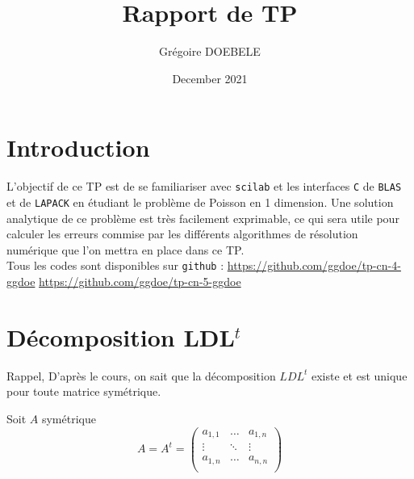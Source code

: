 \documentclass{article}
\title{Rapport de TP}
\author{Grégoire DOEBELE }
\date{December 2021}
\begin{document}
\newcommand{\tikzmark}[1]{\tikz[overlay,remember picture] \node (#1) {};}
\newcommand{\DrawBox}[4][]{%
    \tikz[overlay,remember picture]{%
        \coordinate (TopLeft)     at ($(#2)+(-0.2em,0.9em)$);
        \coordinate (BottomRight) at ($(#3)+(0.2em,-0.3em)$);
        \path (TopLeft); \pgfgetlastxy{\XCoord}{\IgnoreCoord};
        \path (BottomRight); \pgfgetlastxy{\IgnoreCoord}{\YCoord};
        \coordinate (LabelPoint) at ($(\XCoord,\YCoord)!0.5!(BottomRight)$);
        \draw [red,#1] (TopLeft) rectangle (BottomRight);
        \node [below, #1, fill=none, fill opacity=1] at (LabelPoint) {#4};
    }
}


\maketitle

\section{Introduction}

L'objectif de ce TP est de se familiariser avec \texttt{scilab} et les interfaces \texttt{C} de \texttt{BLAS} et de \texttt{LAPACK} en étudiant le problème de Poisson en 1 dimension. Une solution analytique de ce problème est très facilement exprimable, ce qui sera utile pour calculer les erreurs commise par les différents algorithmes de résolution numérique que l'on mettra en place dans ce TP.
\\\newline\noindent
Tous les codes sont disponibles sur \texttt{github} :
\newline\noindent
\href{https://github.com/ggdoe/tp-cn-4-ggdoe}{https://github.com/ggdoe/tp-cn-4-ggdoe}\newline
\href{https://github.com/ggdoe/tp-cn-5-ggdoe}{https://github.com/ggdoe/tp-cn-5-ggdoe}

\section{Décomposition LDL\(^t\)}

Rappel,\newline
D'après le cours, on sait que la décomposition \(LDL^t\) existe et est unique pour toute matrice symétrique.

Soit \(A\) symétrique
\[
	A = A^t = 
	\begin{pmatrix}
	a_{1,1}	& \dots	& a_{1,n} 	\\
	\vdots	& \ddots& \vdots	\\
	a_{1,n}	& \dots & a_{n,n} 	\\
	\end{pmatrix}
\]
\end{document}
